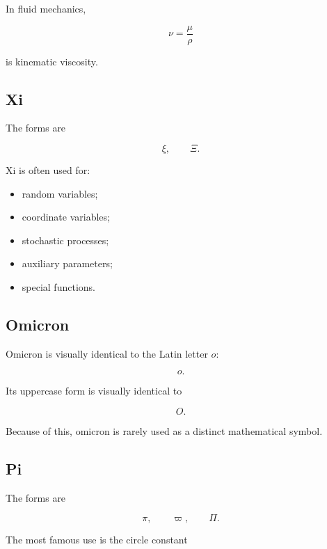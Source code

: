 In fluid mechanics,

\[
\boxed{
\nu
=
\frac{\mu}{\rho}
}
\]

is kinematic viscosity.

\subsection{Xi}
\label{subsec:greek-xi}

The forms are

\[
\boxed{
\xi,
\qquad
\Xi.
}
\]

Xi is often used for:

\begin{itemize}
    \item random variables;
    \item coordinate variables;
    \item stochastic processes;
    \item auxiliary parameters;
    \item special functions.
\end{itemize}

\subsection{Omicron}
\label{subsec:greek-omicron}

Omicron is visually identical to the Latin letter \(o\):

\[
\boxed{
o.
}
\]

Its uppercase form is visually identical to

\[
\boxed{
O.
}
\]

Because of this, omicron is rarely used as a distinct mathematical symbol.

\subsection{Pi}
\label{subsec:greek-pi}

The forms are

\[
\boxed{
\pi,
\qquad
\varpi,
\qquad
\Pi.
}
\]

The most famous use is the circle constant


